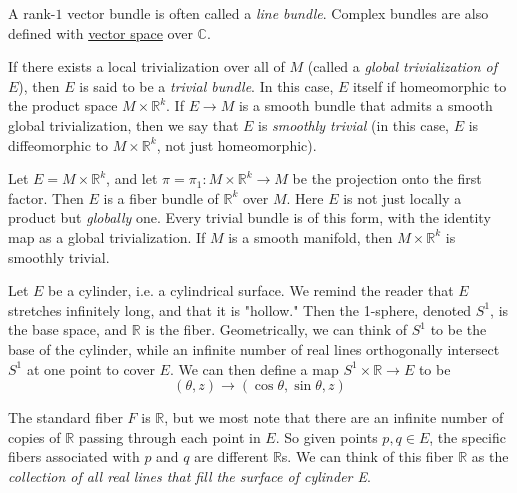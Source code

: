 \documentclass{article}
\newcounter{definition}[section]
\newcounter{example}[section]
\begin{document}
  A rank-$1$ vector bundle is often called a \textit{line bundle}. Complex bundles are also defined with \hyperref[lin-def:vector-space]{vector space} over $\mathbb{C}$. 

  \begin{definition}
    \label{def:global-trivialization-and-trivial-bundles}
  If there exists a local trivialization over all of $M$ (called a \textit{global trivialization of $E$}), then $E$ is said to be a \textit{trivial bundle}. In this case, $E$ itself if homeomorphic to the product space $M \times \mathbb{R}^k$. If $E \to M$ is a smooth bundle that admits a smooth global trivialization, then we say that $E$ is \textit{smoothly trivial} (in this case, $E$ is diffeomorphic to $M \times \mathbb{R}^k$, not just homeomorphic). 
  \end{definition}

  \begin{example}
    \label{ex:trivial-bundle}
  Let $E = M \times \mathbb{R}^k$, and let $\pi = \pi_1: M \times \mathbb{R}^k \to M$ be the projection onto the first factor. Then $E$ is a fiber bundle of $\mathbb{R}^k$ over $M$. Here $E$ is not just locally a product but \textit{globally} one. Every trivial bundle is of this form, with the identity map as a global trivialization. If $M$ is a smooth manifold, then $M \times \mathbb{R}^k$ is smoothly trivial. 
  \end{example}

  \begin{example}
    \label{ex:the-cylinder-as-a-trivial-bundle}
  Let $E$ be a cylinder, i.e. a cylindrical surface. We remind the reader that $E$ stretches infinitely long, and that it is "hollow." Then the 1-sphere, denoted $S^1$, is the base space, and $\mathbb{R}$ is the fiber. Geometrically, we can think of $S^1$ to be the base of the cylinder, while an infinite number of real lines orthogonally intersect $S^1$ at one point to cover $E$. We can then define a map $ S^1 \times \mathbb{R} \to E$ to be 
  \begin{equation}
    (\theta, z) \to (\cos{\theta}, \sin{\theta}, z)
  \end{equation}
  \end{example}

  The standard fiber $F$ is $\mathbb{R}$, but we most note that there are an infinite number of copies of $\mathbb{R}$ passing through each point in $E$. So given points $p, q \in E$, the specific fibers associated with $p$ and $q$ are different $\mathbb{R}$s. We can think of this fiber $\mathbb{R}$ as the \textit{collection of all real lines that fill the surface of cylinder E}. 
\end{document}
